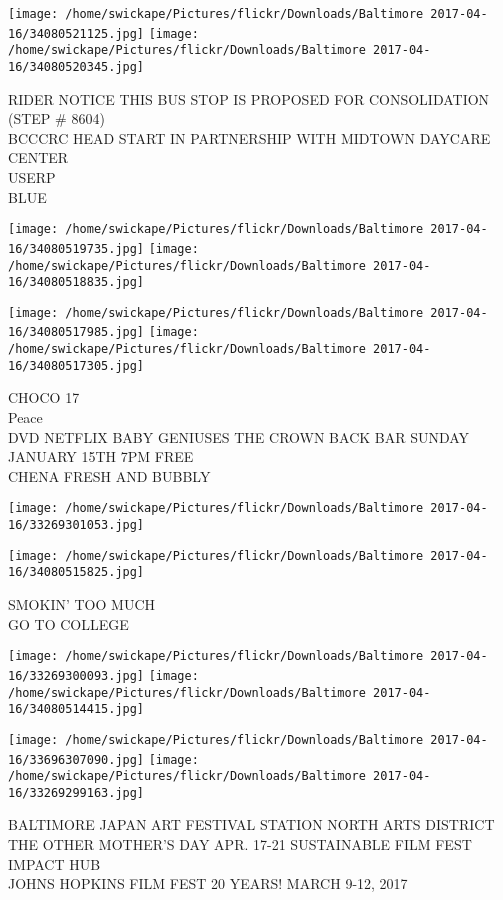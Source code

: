 \documentclass[10pt,letterpaper]{article}
\begin{document}
\texttt{[image: /home/swickape/Pictures/flickr/Downloads/Baltimore 2017-04-16/34080521125.jpg]}
\texttt{[image: /home/swickape/Pictures/flickr/Downloads/Baltimore 2017-04-16/34080520345.jpg]}

RIDER NOTICE THIS BUS STOP IS PROPOSED FOR CONSOLIDATION (STEP \# 8604)\\
BCCCRC HEAD START IN PARTNERSHIP WITH MIDTOWN DAYCARE CENTER\\
USERP\\
BLUE
\pagebreak

\texttt{[image: /home/swickape/Pictures/flickr/Downloads/Baltimore 2017-04-16/34080519735.jpg]}
\texttt{[image: /home/swickape/Pictures/flickr/Downloads/Baltimore 2017-04-16/34080518835.jpg]}

\texttt{[image: /home/swickape/Pictures/flickr/Downloads/Baltimore 2017-04-16/34080517985.jpg]}
\texttt{[image: /home/swickape/Pictures/flickr/Downloads/Baltimore 2017-04-16/34080517305.jpg]}

CHOCO 17\\
Peace\\
DVD NETFLIX BABY GENIUSES THE CROWN BACK BAR SUNDAY JANUARY 15TH 7PM FREE\\
CHENA FRESH AND BUBBLY
\pagebreak

\texttt{[image: /home/swickape/Pictures/flickr/Downloads/Baltimore 2017-04-16/33269301053.jpg]}

\vspace{0.25in}
\texttt{[image: /home/swickape/Pictures/flickr/Downloads/Baltimore 2017-04-16/34080515825.jpg]}

SMOKIN' TOO MUCH\\
GO TO COLLEGE
\pagebreak

\texttt{[image: /home/swickape/Pictures/flickr/Downloads/Baltimore 2017-04-16/33269300093.jpg]}
\texttt{[image: /home/swickape/Pictures/flickr/Downloads/Baltimore 2017-04-16/34080514415.jpg]}

\texttt{[image: /home/swickape/Pictures/flickr/Downloads/Baltimore 2017-04-16/33696307090.jpg]}
\texttt{[image: /home/swickape/Pictures/flickr/Downloads/Baltimore 2017-04-16/33269299163.jpg]}

BALTIMORE JAPAN ART FESTIVAL STATION NORTH ARTS DISTRICT\\
THE OTHER MOTHER'S DAY APR. 17{-}21 SUSTAINABLE FILM FEST\\
IMPACT HUB\\
JOHNS HOPKINS FILM FEST 20 YEARS!  MARCH 9{-}12, 2017
\pagebreak
\end{document}
